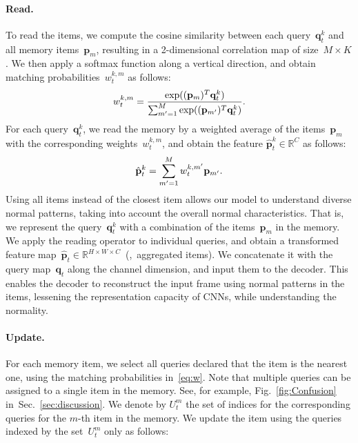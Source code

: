 \documentclass[10pt,twocolumn,letterpaper]{article}
\begin{document}
\vspace{-0.4cm}
			\paragraph{Read.} To read the items, we compute the cosine similarity between each query~${\mathbf{q}}_t^k$ and all memory items~$\mathbf{p}_m$, resulting in a 2-dimensional correlation map of size~$M \times K$. We then apply a softmax function along a vertical direction, and obtain matching probabilities~$w_t^{k,m}$ as follows:
				\begin{equation}\label{eq:w}
\vspace{-0.15cm}
					w_t^{k,m} = \frac{\exp((\mathbf{p}_m)^T\mathbf{q}_t^k)}{\sum_{m'=1}^M \exp((\mathbf{p}_{m'})^T\mathbf{q}_t^k)}.
\vspace{-0.1cm}
				\end{equation}
For each query~${\mathbf{q}}_t^k$, we read the memory by a weighted average of the items~$\mathbf{p}_m$ with the corresponding weights~$w_t^{k,m}$, and obtain the feature $\hat{\mathbf{p}}_t^k \in \mathbb{R}^C$ as follows:
				\begin{equation}
\vspace{-0.15cm}
                	\hat{\mathbf{p}}^k_t = \sum_{m'=1}^M w_t^{k,m'}\mathbf{p}_{m'}.
\vspace{-0.1cm}
            	\end{equation}
Using all items instead of the closest item allows our model to understand diverse normal patterns, taking into account the overall normal characteristics. That is, we represent the query~${\mathbf{q}}_t^k$ with a combination of the items~$\mathbf{p}_m$ in the memory. We apply the reading operator to individual queries, and obtain a transformed feature map~$\hat{\mathbf{p}}_t \in \mathbb{R}^{H \times W \times C}$~(\ie,~aggregated items). We concatenate it with the query map~$\mathbf{q}_t$ along the channel dimension, and input them to the decoder. This enables the decoder to reconstruct the input frame using normal patterns in the items, lessening the representation capacity of CNNs, while understanding the normality. 
			

\vspace{-0.4cm}
		\paragraph{Update.}
For each memory item, we select all queries declared that the item is the nearest one, using the matching probabilities in~\eqref{eq:w}. Note that multiple queries can be assigned to a single item in the memory. See, for example, Fig.~\ref{fig:Confusion} in~Sec.~\ref{sec:discussion}. We denote by $U_t^m$ the set of indices for the corresponding queries for the $m$-th item in the memory. We update the item using the queries indexed by the set~$U_t^m$ only as follows:
\end{document}
